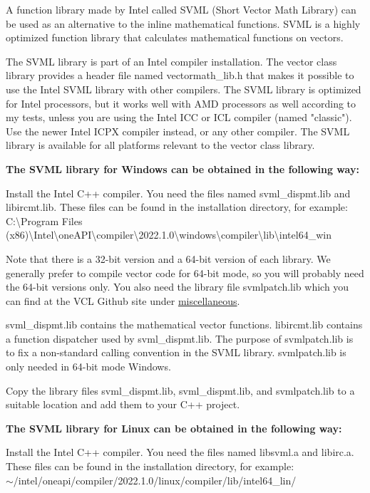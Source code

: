 \documentclass[vcl_manual.tex]{subfiles}
\begin{document}
A function library made by Intel called SVML (Short Vector Math Library) can be used as an alternative to the inline mathematical functions. SVML is a highly optimized function library that calculates mathematical functions on vectors.

The SVML library is part of an Intel compiler installation. The vector class library provides a header file named vectormath\_lib.h that makes it possible to use the Intel SVML library with other compilers. The SVML library is optimized for Intel processors, but it works well with AMD processors as well according to my tests, unless you are using the Intel ICC or ICL compiler (named "classic"). Use the newer Intel ICPX compiler instead, or any other compiler. The SVML library is available for all platforms relevant to the vector class library.

\textbf{The SVML library for Windows can be obtained in the following way:}

Install the Intel C++ compiler. You need the files named svml\_dispmt.lib and libircmt.lib. These files can be found in the installation directory, for example:\\
C:\textbackslash Program Files (x86)\textbackslash Intel\textbackslash oneAPI\textbackslash compiler\textbackslash 2022.1.0\textbackslash windows\textbackslash compiler\textbackslash lib\textbackslash intel64\_win

Note that there is a 32-bit version and a 64-bit version of each library. We generally prefer to compile vector code for 64-bit mode, so you will probably need the 64-bit versions only. You also need the library file svmlpatch.lib which you can find at the VCL Github site under 
\href{https://github.com/vectorclass/miscellaneous/tree/master/svmlpatch}{miscellaneous}. 

svml\_dispmt.lib contains the mathematical vector functions. libircmt.lib contains a function dispatcher used by svml\_dispmt.lib. 
The purpose of svmlpatch.lib is to fix a non-standard calling convention in the SVML library. svmlpatch.lib is only needed in 64-bit mode Windows.

Copy the library files svml\_dispmt.lib, svml\_dispmt.lib, and svmlpatch.lib to a suitable location and add them to your C++ project.


\textbf{The SVML library for Linux can be obtained in the following way:}

Install the Intel C++ compiler. You need the files named libsvml.a and libirc.a. These files can be found in the installation directory, for example:\\
$\sim$/intel/oneapi/compiler/2022.1.0/linux/compiler/lib/intel64\_lin/
\end{document}
